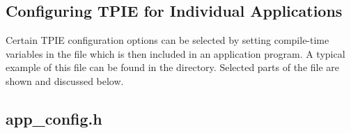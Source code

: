 \subsection{Configuring TPIE for Individual Applications}\label{sec:appconfig}

Certain TPIE configuration options can be selected by
setting compile-time variables in the file
which is then included in an application program. A typical
example of this file can be found in the 
directory. Selected parts of the file are shown
and discussed below. 

\subsection{app\_config.h}

